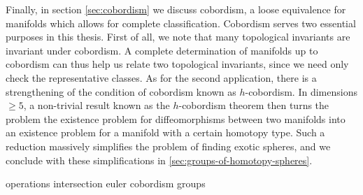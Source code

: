 Finally, in section \cref{sec:cobordism} we discuss cobordism, a loose equivalence for manifolds which allows for complete classification. Cobordism serves two essential purposes in this thesis. First of all, we note that many topological invariants are invariant under cobordism. A complete determination of manifolds up to cobordism can thus help us relate two topological invariants, since we need only check the representative classes. As for the second application, there is a strengthening of the condition of cobordism known as $h$-cobordism. 
In dimensions $\geq 5$, a non-trivial result known as the $h$-cobordism theorem then turns the problem the existence problem for diffeomorphisms between two manifolds into an existence problem for a manifold with a certain homotopy type.
Such a reduction massively simplifies the problem of finding exotic spheres, and we conclude with these simplifications in \cref{sec:groups-of-homotopy-spheres}.

{operations}
{intersection}
{euler}
{cobordism}
{groups}
